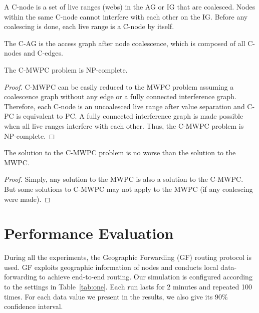 \documentclass[format=acmsmall, review=false]{acmart}
\begin{document}
\begin{definition}A C-node is a set of
	live ranges (webs) in the AG or IG that are coalesced. Nodes within the same
	C-node cannot interfere with each other on the IG. Before any coalescing is
	done, each live range is a C-node by itself.
\end{definition}

\begin{definition}The C-AG is the access
	graph after node coalescence, which is composed of all C-nodes and C-edges.
\end{definition}

\begin{lemma}
	The C-MWPC problem is NP-complete.
\end{lemma}
\begin{proof} C-MWPC can be easily reduced to the MWPC problem assuming a
	coalescence graph without any edge or a fully connected interference graph.
	Therefore, each C-node is an uncoalesced live range after value separation
	and C-PC is equivalent to PC. A fully connected interference graph is made
	possible when all live ranges interfere with each other. Thus, the C-MWPC
	problem is NP-complete.
\end{proof}

\begin{lemma}The solution to the C-MWPC problem is no
	worse than the solution to the MWPC.
\end{lemma}
\begin{proof}
	Simply, any solution to the MWPC is also a solution to the
	C-MWPC. But some solutions to C-MWPC may not apply to the MWPC (if any
	coalescing were made).
\end{proof}

\section{Performance Evaluation}

During all the experiments, the Geographic Forwarding (GF)
\cite{Akyildiz-01} routing protocol is used. GF exploits geographic
information of nodes and conducts local data-forwarding to achieve
end-to-end routing. Our simulation is configured according to the
settings in Table~\ref{tab:one}. Each run lasts for 2 minutes and
repeated 100 times. For each data value we present in the results, we
also give its 90\% confidence interval.
\end{document}
